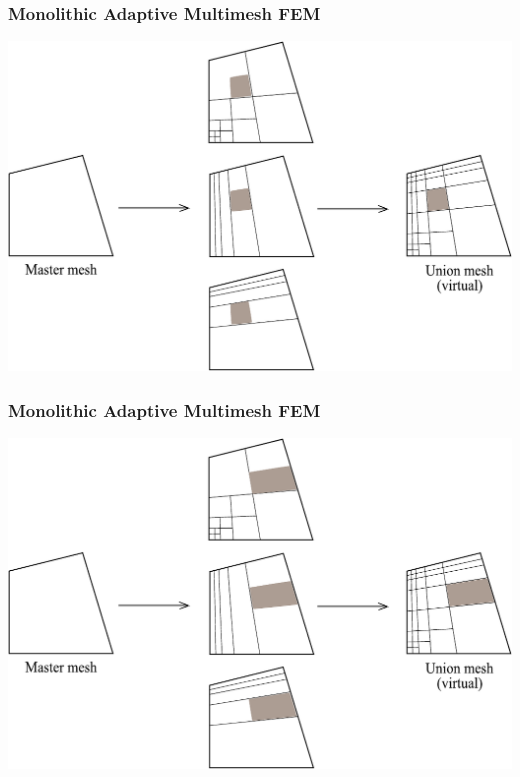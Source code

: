 \begin{frame}
  \frametitle{Monolithic Adaptive Multimesh FEM}
  \begin{center}
    \includegraphics[height=0.7\textheight]{multimesh/mm_18.pdf}
  \end{center}
\end{frame}

\begin{frame}
  \frametitle{Monolithic Adaptive Multimesh FEM}
  \begin{center}
    \includegraphics[height=0.7\textheight]{multimesh/mm_19.pdf}
  \end{center}
\end{frame}

